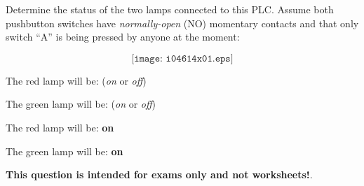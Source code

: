 

Determine the status of the two lamps connected to this PLC.  Assume both pushbutton switches have {\it normally-open} (NO) momentary contacts and that only switch ``A'' is being pressed by anyone at the moment:

$$\texttt{[image: i04614x01.eps]}$$

\vskip 10pt

The red lamp will be: ({\it on} or {\it off})

\vskip 10pt

The green lamp will be: ({\it on} or {\it off})







The red lamp will be: {\bf on}

\vskip 10pt

The green lamp will be: {\bf on}







{\bf This question is intended for exams only and not worksheets!}.


